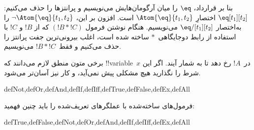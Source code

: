 \documentclass[../../../include/open-logic-section]{subfiles}
\begin{document}
بنا بر قرارداد، $\eq$ را میان آرگومان‌هایش می‌نویسیم و پرانتزها را حذف
می‌کنیم: $\eq[t_1][t_2]$ اختصارِ $\Atom{\eq}{t_1,t_2}$ است. افزون بر این،
$\lnot \Atom{\eq}{t_1,t_2}$ را به‌اختصار $\eq/[t_1][t_2]$ می‌نویسیم.
هنگام نوشتن فرمول $(!B \ast !C)$ که از $!B$ و $!C$ با استفاده از رابط
دوجایگاهی~$\ast$ ساخته شده است، اغلب بیرونی‌ترین جفت پرانتز را حذف می‌کنیم
و فقط~$!B \ast !C$ می‌نویسیم.

\begin{intro}
برخی متون منطق لازم می‌دانند که !!{variable}~$x$ در~$!A$ رخ دهد تا
%
%
%
به شمار آیند. اگر این شرط را نگذارید هیچ مشکلی پیش نمی‌آید، و کار نیز
آسان‌تر می‌شود.
\end{intro}

\begin{tagblock}{defNot,defOr,defAnd,defIf,defIff,defTrue,defFalse,defEx,defAll}
\begin{defn}
فرمول‌های ساخته‌شده با عملگرهای تعریف‌شده را باید چنین فهمید:

\begin{tagenumerate}{defTrue,defFalse,defNot,defOr,defAnd,defIf,defIff,defEx,defAll}









\end{tagenumerate}
\end{defn}
\end{tagblock}
\end{document}
